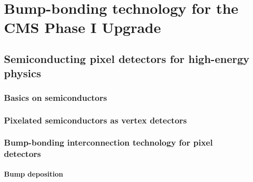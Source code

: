 \part{Bump-bonding technology for the CMS Phase I Upgrade}

\chapter{Semiconducting pixel detectors for high-energy physics}


\section{Basics on semiconductors}

\section{Pixelated semiconductors as vertex detectors}

\section{Bump-bonding interconnection technology for pixel detectors}

\subsection{Bump deposition}
